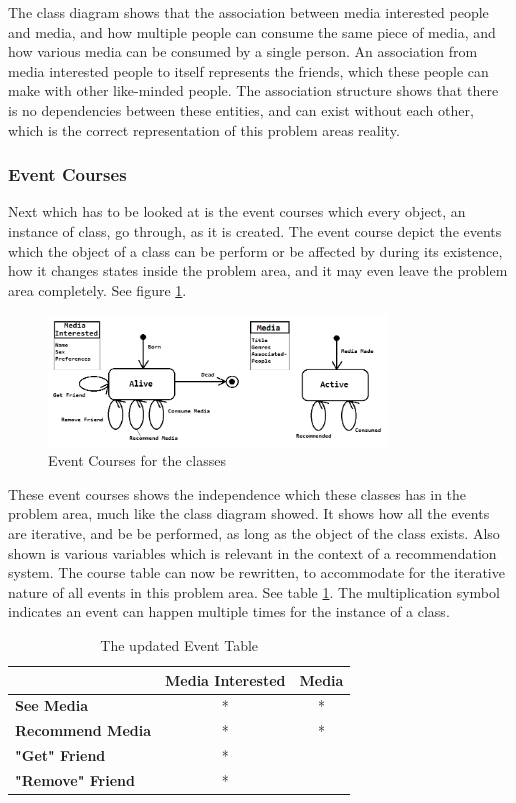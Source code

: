 The class diagram shows that the association between media interested people and media, and how multiple people can consume the same piece of media, and how various media can be consumed by a single person. An association from media interested people to itself represents the friends, which these people can make with other like-minded people. The association structure shows that there is no dependencies between these entities, and can exist without each other, which is the correct representation of this problem areas reality.

\subsubsection{Event Courses}

Next which has to be looked at is the event courses which every object, an instance of class, go through, as it is created. The event course depict the events which the object of a class can be perform or be affected by during its existence, how it changes states inside the problem area, and it may even leave the problem area completely. See figure \ref{Courses}.

\begin{figure}[htb]
\centering
\includegraphics[width=0.8\textwidth]{Images/courses.png}
\caption{Event Courses for the classes}
\label{Courses}
\end{figure}

These event courses shows the independence which these classes has in the problem area, much like the class diagram showed. It shows how all the events are iterative, and be be performed, as long as the object of the class exists. Also shown is various variables which is relevant in the context of a recommendation system. The course table can now be rewritten, to accommodate for the iterative nature of all events in this problem area. See table \ref{UpdatedEventTable}. The multiplication symbol indicates an event can happen multiple times for the instance of a class.

\begin{table}[htb]
\centering
\begin{tabular}{|l|c|c|} \hline
	  & \textbf{Media Interested} & \textbf{Media} \\ \hline
	\textbf{See Media} & * & * \\ \hline
	\textbf{Recommend Media} & * & * \\ \hline
	\textbf{"Get" Friend} & * &  \\ \hline
	\textbf{"Remove" Friend} & * &  \\ \hline
\end{tabular}
\caption{The updated Event Table}
\label{UpdatedEventTable}
\end{table}
